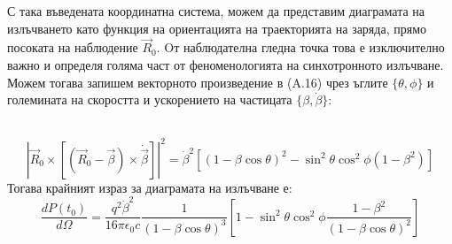 \begin{appendices}
\begin{minipage}{16em}
			
		
		\captionsetup{font=footnotesize}
		\label{Emission_Frame}

\end{minipage}
\begin{minipage}{20em}
	С така въведената координатна система, можем да представим диаграмата на излъчването като функция на ориентацията на траекторията на заряда, прямо посоката на наблюдение $\vec{R}_0$. Oт наблюдателна гледна точка това е изключително важно и определя голяма част от феноменологията на синхотронното излъчване. Можем тогава запишем векторното произведение в (A.16) чрез ъглите $\{\theta,\phi\}$ и големината на скоростта и ускорението на частицата $\{\beta,\dot{\beta}\}$:
\end{minipage}\\

\begin{equation}
		\left|\vec{R}_0 \times \left[\left(\vec{R}_0 - \vec{\beta}\right)\times\dot{\vec{\beta}}\right]\right|^2 =\dot{\beta}^2\left[ 
		(1-\beta \cos\theta)^2 - \sin^2\theta\cos^2\phi (1-\beta^2)\right]
\end{equation}
Тогава крайният израз за диаграмата на излъчване е:
\begin{equation}\label{Radiation_pattern_analytic}
	\frac{dP(t_0)}{d\Omega} = \frac{q^2\dot{\beta}^2}{16\pi\epsilon_0 c}\frac{1}{(1-\beta\cos\theta)^3}\left[1-\sin^2\theta\cos^2\phi\frac{1 - \beta^2}{(1-\beta\cos\theta)^2}\right]
\end{equation}


\end{appendices}
